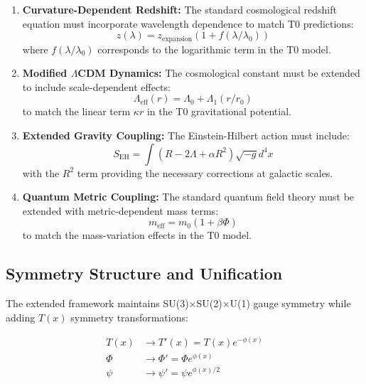 \documentclass[12pt,a4paper]{article}
\newcommand{\Tfield}{T(x)}
\begin{document}
	\begin{enumerate}
		\item \textbf{Curvature-Dependent Redshift:} The standard cosmological redshift equation must incorporate wavelength dependence to match T0 predictions:
		\begin{equation}
			z(\lambda) = z_{\text{expansion}}(1 + f(\lambda/\lambda_0))
		\end{equation}
		where $f(\lambda/\lambda_0)$ corresponds to the logarithmic term in the T0 model.
		
		\item \textbf{Modified $\Lambda$CDM Dynamics:} The cosmological constant must be extended to include scale-dependent effects:
		\begin{equation}
			\Lambda_{\text{eff}}(r) = \Lambda_0 + \Lambda_1(r/r_0)
		\end{equation}
		to match the linear term $\kappa r$ in the T0 gravitational potential.
		
		\item \textbf{Extended Gravity Coupling:} The Einstein-Hilbert action must include:
		\begin{equation}
			S_{\text{EH}} = \int(R - 2\Lambda + \alpha R^2)\sqrt{-g}d^4x
		\end{equation}
		with the $R^2$ term providing the necessary corrections at galactic scales.
		
		\item \textbf{Quantum Metric Coupling:} The standard quantum field theory must be extended with metric-dependent mass terms:
		\begin{equation}
			m_{\text{eff}} = m_0(1 + \beta\Phi)
		\end{equation}
		to match the mass-variation effects in the T0 model.
	\end{enumerate}
	
	\subsection{Symmetry Structure and Unification}
	
	The extended framework maintains SU(3)×SU(2)×U(1) gauge symmetry while adding $\Tfield$ symmetry transformations:
	
	\begin{equation}
		\begin{aligned}
			T(x) &\rightarrow T'(x) = T(x)e^{-\phi(x)} \\
			\Phi &\rightarrow \Phi' = \Phi e^{\phi(x)} \\
			\psi &\rightarrow \psi' = \psi e^{\phi(x)/2}
		\end{aligned}
	\end{equation}
	
\end{document}
